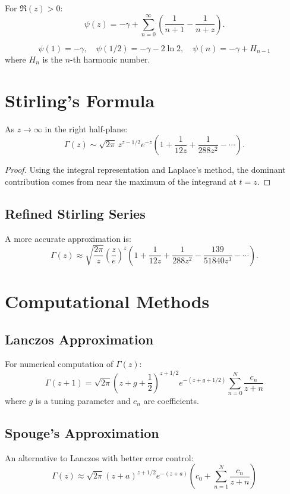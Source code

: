 \begin{theorem}
For $\Re(z) > 0$:
\[
\psi(z) = -\gamma + \sum_{n=0}^\infty \left(\frac{1}{n+1} - \frac{1}{n+z}\right).
\]
\end{theorem}

\begin{theorem}
\[
\psi(1) = -\gamma, \quad \psi(1/2) = -\gamma - 2\ln 2, \quad \psi(n) = -\gamma + H_{n-1}
\]
where $H_n$ is the $n$-th harmonic number.
\end{theorem}

\section{Stirling's Formula}

\begin{theorem}
As $z \to \infty$ in the right half-plane:
\[
\Gamma(z) \sim \sqrt{2\pi} \, z^{z-1/2} e^{-z} \left(1 + \frac{1}{12z} + \frac{1}{288z^2} - \cdots\right).
\]
\end{theorem}

\begin{proof}
Using the integral representation and Laplace's method, the dominant contribution comes from near the maximum of the integrand at $t = z$.
\end{proof}

\subsection{Refined Stirling Series}

A more accurate approximation is:
\[
\Gamma(z) \approx \sqrt{\frac{2\pi}{z}} \left(\frac{z}{e}\right)^z \left(1 + \frac{1}{12z} + \frac{1}{288z^2} - \frac{139}{51840z^3} - \cdots\right).
\]

\section{Computational Methods}

\subsection{Lanczos Approximation}
For numerical computation of $\Gamma(z)$:
\[
\Gamma(z+1) = \sqrt{2\pi} \left(z + g + \frac{1}{2}\right)^{z+1/2} e^{-(z+g+1/2)} \sum_{n=0}^{N} \frac{c_n}{z+n}
\]
where $g$ is a tuning parameter and $c_n$ are coefficients.

\subsection{Spouge's Approximation}
An alternative to Lanczos with better error control:
\[
\Gamma(z) \approx \sqrt{2\pi}(z+a)^{z+1/2}e^{-(z+a)}\left(c_0 + \sum_{n=1}^N \frac{c_n}{z+n}\right)
\]

